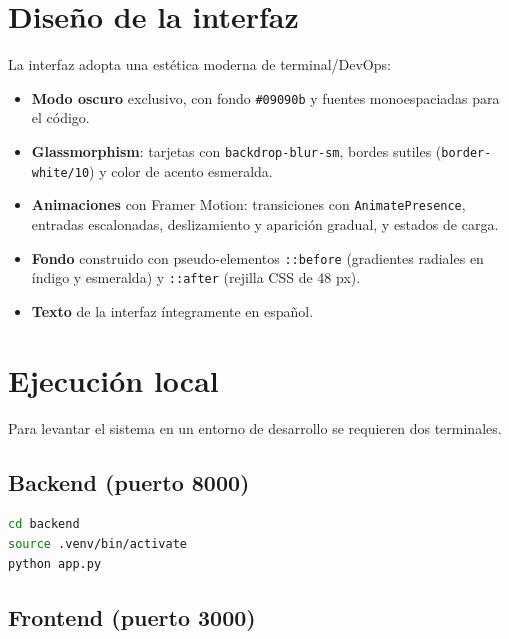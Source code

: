 \documentclass[12pt,a4paper]{article}
\begin{document}
\section{Diseño de la interfaz}

La interfaz adopta una estética moderna de terminal/DevOps:

\begin{itemize}
    \item \textbf{Modo oscuro} exclusivo, con fondo \texttt{\#09090b} y fuentes
    monoespaciadas para el código.
    \item \textbf{Glassmorphism}: tarjetas con \texttt{backdrop-blur-sm},
    bordes sutiles (\texttt{border-white/10}) y color de acento esmeralda.
    \item \textbf{Animaciones} con Framer Motion: transiciones con
    \texttt{AnimatePresence}, entradas escalonadas, deslizamiento y aparición
    gradual, y estados de carga.
    \item \textbf{Fondo} construido con pseudo-elementos \texttt{::before}
    (gradientes radiales en índigo y esmeralda) y \texttt{::after} (rejilla CSS
    de 48 px).
    \item \textbf{Texto} de la interfaz íntegramente en español.
\end{itemize}

\section{Ejecución local}

Para levantar el sistema en un entorno de desarrollo se requieren dos terminales.

\subsection{Backend (puerto 8000)}

\begin{lstlisting}[language=bash]
cd backend
source .venv/bin/activate
python app.py
\end{lstlisting}

\subsection{Frontend (puerto 3000)}
\end{document}
